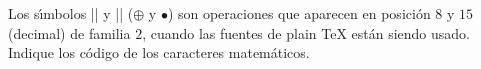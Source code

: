 


\bigskip

\enunciadoS Los s\'{\i}mbolos |\oplus| y |\bullet| ($\oplus$ y
$\bullet$) son operaciones que aparecen en posici\'on $8$ y $15$
(decimal) de familia $2$, cuando las fuentes de plain {\TeX} est\'an
siendo usado. Indique los c\'odigo de los caracteres matem\'aticos.

\bigskip


\bye

